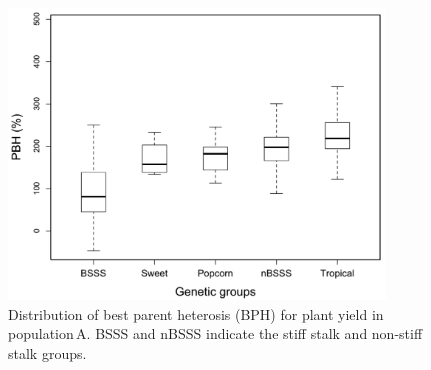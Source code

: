 \documentclass[12pt]{article}
\begin{document}
\begin{figure}[h]
  \begin{center}
   \includegraphics[width=100mm]{BoxplotBPH.png}
    \caption{Distribution of best parent heterosis (BPH) for plant yield in population\,A. BSSS and nBSSS indicate the stiff stalk and non-stiff stalk groups.}
   \label{figureS4}
  \end{center}
\end{figure}
\end{document}
